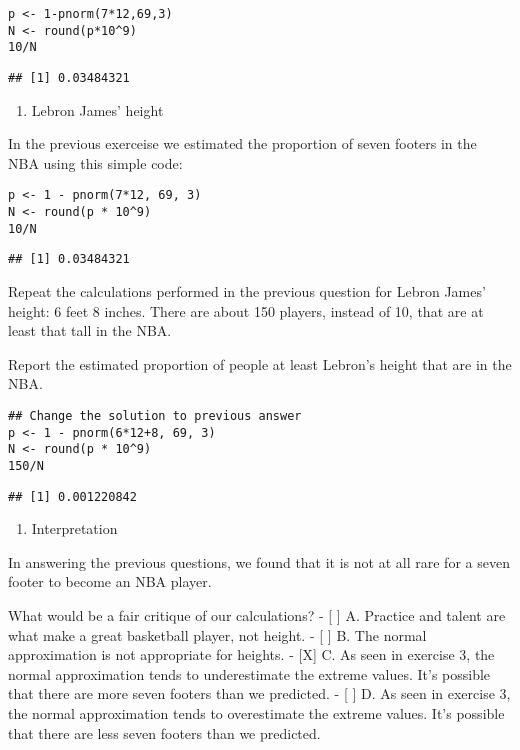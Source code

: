 \documentclass[]{article}
\providecommand{\tightlist}{%
  \setlength{\itemsep}{0pt}\setlength{\parskip}{0pt}}
\begin{document}
\begin{verbatim}
p <- 1-pnorm(7*12,69,3)
N <- round(p*10^9)
10/N
\end{verbatim}

\begin{verbatim}
## [1] 0.03484321
\end{verbatim}

\begin{enumerate}
\def\labelenumi{\arabic{enumi}.}
\setcounter{enumi}{6}
\tightlist
\item
  Lebron James' height
\end{enumerate}

In the previous exerceise we estimated the proportion of seven footers
in the NBA using this simple code:

\begin{verbatim}
p <- 1 - pnorm(7*12, 69, 3)  
N <- round(p * 10^9)  
10/N  
\end{verbatim}

\begin{verbatim}
## [1] 0.03484321
\end{verbatim}

Repeat the calculations performed in the previous question for Lebron
James' height: 6 feet 8 inches. There are about 150 players, instead of
10, that are at least that tall in the NBA.

Report the estimated proportion of people at least Lebron's height that
are in the NBA.

\begin{verbatim}
## Change the solution to previous answer
p <- 1 - pnorm(6*12+8, 69, 3)
N <- round(p * 10^9)
150/N
\end{verbatim}

\begin{verbatim}
## [1] 0.001220842
\end{verbatim}

\begin{enumerate}
\def\labelenumi{\arabic{enumi}.}
\setcounter{enumi}{7}
\tightlist
\item
  Interpretation
\end{enumerate}

In answering the previous questions, we found that it is not at all rare
for a seven footer to become an NBA player.

What would be a fair critique of our calculations? - {[} {]} A. Practice
and talent are what make a great basketball player, not height. - {[}
{]} B. The normal approximation is not appropriate for heights. -
{[}X{]} C. As seen in exercise 3, the normal approximation tends to
underestimate the extreme values. It's possible that there are more
seven footers than we predicted. - {[} {]} D. As seen in exercise 3, the
normal approximation tends to overestimate the extreme values. It's
possible that there are less seven footers than we predicted.
\end{document}

